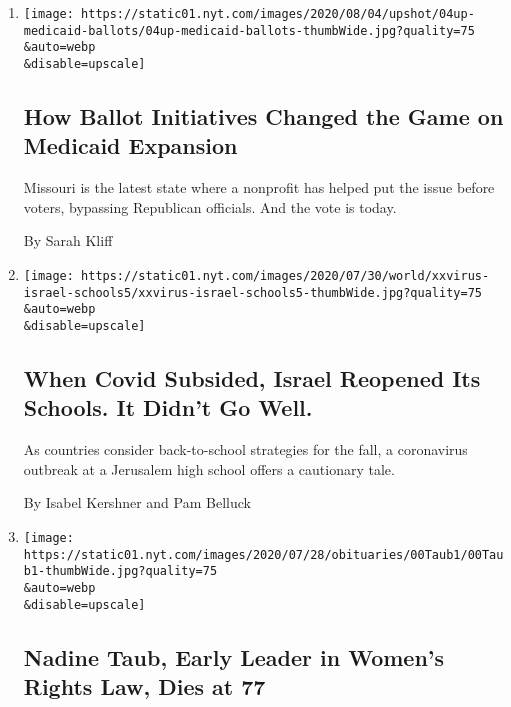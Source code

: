 \begin{enumerate}
\def\labelenumi{\arabic{enumi}.}
\item
  \href{/2020/08/04/upshot/missouri-election-medicaid-expansion.html}{}

  \texttt{[image: https://static01.nyt.com/images/2020/08/04/upshot/04up-medicaid-ballots/04up-medicaid-ballots-thumbWide.jpg?quality=75\\\&auto=webp\\\&disable=upscale]}

  \hypertarget{how-ballot-initiatives-changed-the-game-on-medicaid-expansion}{%
  \subsection{How Ballot Initiatives Changed the Game on Medicaid
  Expansion}\label{how-ballot-initiatives-changed-the-game-on-medicaid-expansion}}

  Missouri is the latest state where a nonprofit has helped put the
  issue before voters, bypassing Republican officials. And the vote is
  today.

  By Sarah Kliff
\item
  \href{/2020/08/04/world/middleeast/coronavirus-israel-schools-reopen.html}{}

  \texttt{[image: https://static01.nyt.com/images/2020/07/30/world/xxvirus-israel-schools5/xxvirus-israel-schools5-thumbWide.jpg?quality=75\\\&auto=webp\\\&disable=upscale]}

  \hypertarget{when-covid-subsided-israel-reopened-its-schools-it-didnt-go-well}{%
  \subsection{When Covid Subsided, Israel Reopened Its Schools. It
  Didn't Go
  Well.}\label{when-covid-subsided-israel-reopened-its-schools-it-didnt-go-well}}

  As countries consider back-to-school strategies for the fall, a
  coronavirus outbreak at a Jerusalem high school offers a cautionary
  tale.

  By Isabel Kershner and Pam Belluck
\item
  \href{/2020/07/24/us/nadine-taub-feminist-lawyer-dead.html}{}

  \texttt{[image: https://static01.nyt.com/images/2020/07/28/obituaries/00Taub1/00Taub1-thumbWide.jpg?quality=75\\\&auto=webp\\\&disable=upscale]}

  \hypertarget{nadine-taub-early-leader-in-womens-rights-law-dies-at-77}{%
  \subsection{Nadine Taub, Early Leader in Women's Rights Law, Dies at
  77}\label{nadine-taub-early-leader-in-womens-rights-law-dies-at-77}}


\end{enumerate}
